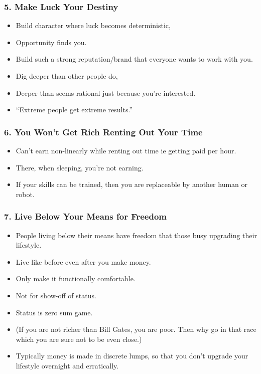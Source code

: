 \begin{frame}[fragile]
\frametitle{5. Make Luck Your Destiny}
\begin{itemize}
\item Build character where luck becomes deterministic, 
\item Opportunity finds you.
\item Build such a strong reputation/brand that everyone wants to work with you.
\item Dig deeper than other people do, 
\item Deeper than seems rational just because you're interested. 
\item ``Extreme people get extreme results.''
\end{itemize}
\end{frame}

\begin{frame}[fragile]
\frametitle{6. You Won't Get Rich Renting Out Your Time}
\begin{itemize}
\item Can't earn non-linearly while renting out time ie getting paid per hour.
\item There, when sleeping, you're not earning.
\item If your skills can be trained, then you are replaceable by another human or robot.
\end{itemize}
\end{frame}


\begin{frame}[fragile]
\frametitle{7. Live Below Your Means for Freedom}
\begin{itemize}
\item People living below their means have freedom that those busy upgrading their lifestyle.
\item Live like before even after you make money. 
\item Only make it functionally comfortable.
\item Not for show-off of status. 
\item Status is zero sum game.
\item (If you are not richer than Bill Gates, you are poor. Then why go in that race which you are sure not to be even close.)
\item Typically money is made in discrete lumps, so that you don't upgrade your lifestyle overnight and erratically.
\end{itemize}
\end{frame}


